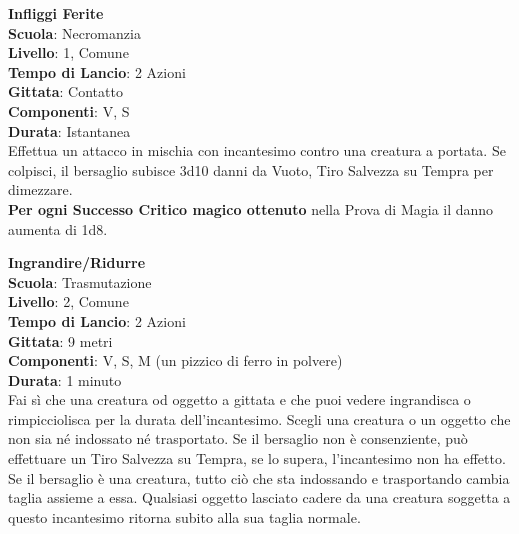 \begin{multicols}{2}
\medskip\textbf{Infliggi Ferite}\\
\textbf{Scuola}: Necromanzia\\
\textbf{Livello}: 1, Comune \\
\textbf{Tempo di Lancio}: 2 Azioni\\
\textbf{Gittata}: Contatto\\
\textbf{Componenti}: V, S\\
\textbf{Durata}: Istantanea\\
Effettua un attacco in mischia con incantesimo contro una creatura a portata. Se colpisci, il bersaglio subisce 3d10 danni da Vuoto, Tiro Salvezza su Tempra per dimezzare.\\
\textbf{Per ogni Successo Critico magico ottenuto} nella Prova di Magia il danno aumenta di 1d8.

\medskip\textbf{Ingrandire/Ridurre}\\
\textbf{Scuola}: Trasmutazione\\
\textbf{Livello}: 2, Comune\\
\textbf{Tempo di Lancio}: 2 Azioni\\
\textbf{Gittata}: 9 metri\\
\textbf{Componenti}: V, S, M (un pizzico di ferro in polvere)\\
\textbf{Durata}: 1 minuto\\
Fai sì che una creatura od oggetto a gittata e che puoi vedere ingrandisca o rimpicciolisca per la durata dell'incantesimo. Scegli una creatura o un oggetto che non sia né indossato né trasportato. Se il bersaglio non è consenziente, può effettuare un Tiro Salvezza su Tempra, se lo supera, l'incantesimo non ha effetto. Se il bersaglio è una creatura, tutto ciò che sta indossando e trasportando cambia taglia assieme a essa. Qualsiasi oggetto lasciato cadere da una creatura soggetta a questo incantesimo ritorna subito alla sua taglia normale.\\


\end{multicols}
